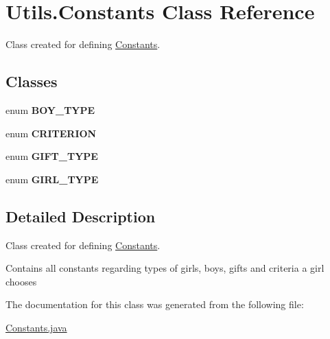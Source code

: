 \hypertarget{class_utils_1_1_constants}{}\section{Utils.\+Constants Class Reference}
\label{class_utils_1_1_constants}


Class created for defining \hyperlink{class_utils_1_1_constants}{Constants}.  


\subsection*{Classes}
\begin{DoxyCompactItemize}
\item 
enum {\bfseries B\+O\+Y\+\_\+\+T\+Y\+PE}
\item 
enum {\bfseries C\+R\+I\+T\+E\+R\+I\+ON}
\item 
enum {\bfseries G\+I\+F\+T\+\_\+\+T\+Y\+PE}
\item 
enum {\bfseries G\+I\+R\+L\+\_\+\+T\+Y\+PE}
\end{DoxyCompactItemize}


\subsection{Detailed Description}
Class created for defining \hyperlink{class_utils_1_1_constants}{Constants}. 

Contains all constants regarding types of girls, boys, gifts and criteria a girl chooses 

The documentation for this class was generated from the following file\+:\begin{DoxyCompactItemize}
\item 
\hyperlink{_constants_8java}{Constants.\+java}\end{DoxyCompactItemize}
